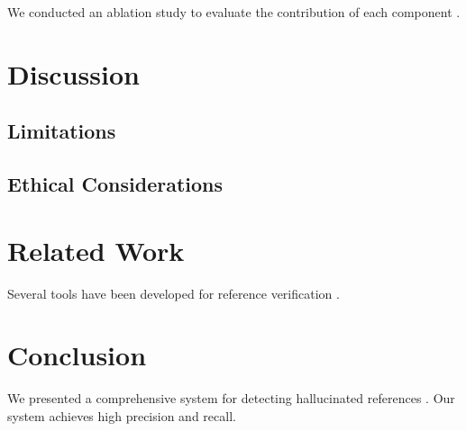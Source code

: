 \documentclass[11pt]{article}
\begin{document}
We conducted an ablation study to evaluate the contribution of each component \cite{chang-etal-2019-bert-hallucinated,devlin-etal-2020-recursive-hallucinated}.

\lipsum[45-46]

\section{Discussion}

\lipsum[34-36]

\subsection{Limitations}

\lipsum[37-38]

\subsection{Ethical Considerations}

\lipsum[47-48]

\section{Related Work}

Several tools have been developed for reference verification \cite{devlin-etal-2019-bert,brown-etal-2020-language,park-etal-2022-neural}.

\lipsum[39-40]

\lipsum[49-50]

\section{Conclusion}

We presented a comprehensive system for detecting hallucinated references \cite{vaswani-etal-2017-attention,wolf-etal-2020-transformers,devlin-etal-2020-recursive-hallucinated}. Our system achieves high precision and recall.

\lipsum[41]



\end{document}
